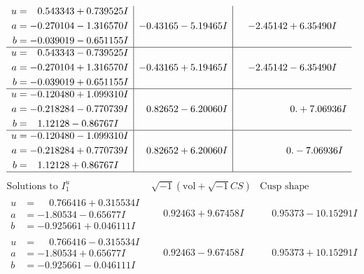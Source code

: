 \documentclass[1p]{elsarticle_modified}
\theoremstyle{definition}
\newcommand{\I}{\sqrt{-1}}
\begin{document}
$$\begin{array}{c|c|c}
\begin{aligned}
u &= \phantom{-}0.543343 + 0.739525 I \\
a &= -0.270104 - 1.316570 I \\
b &= -0.039019 - 0.651155 I\end{aligned}
 & -0.43165 - 5.19465 I & -2.45142 + 6.35490 I \\ \hline\begin{aligned}
u &= \phantom{-}0.543343 - 0.739525 I \\
a &= -0.270104 + 1.316570 I \\
b &= -0.039019 + 0.651155 I\end{aligned}
 & -0.43165 + 5.19465 I & -2.45142 - 6.35490 I \\ \hline\begin{aligned}
u &= -0.120480 + 1.099310 I \\
a &= -0.218284 - 0.770739 I \\
b &= \phantom{-}1.12128 - 0.86767 I\end{aligned}
 & \phantom{-}0.82652 - 6.20060 I & \phantom{-0.000000 -}0. + 7.06936 I \\ \hline\begin{aligned}
u &= -0.120480 - 1.099310 I \\
a &= -0.218284 + 0.770739 I \\
b &= \phantom{-}1.12128 + 0.86767 I\end{aligned}
 & \phantom{-}0.82652 + 6.20060 I & \phantom{-0.000000 } 0. - 7.06936 I\\
 \hline 
 \end{array}$$\newpage$$\begin{array}{c|c|c}  
\text{Solutions to }I^u_{1}& \I (\text{vol} + \sqrt{-1}CS) & \text{Cusp shape}\\
 \hline 
\begin{aligned}
u &= \phantom{-}0.766416 + 0.315534 I \\
a &= -1.80534 - 0.65677 I \\
b &= -0.925661 + 0.046111 I\end{aligned}
 & \phantom{-}0.92463 + 9.67458 I & \phantom{-}0.95373 - 10.15291 I \\ \hline\begin{aligned}
u &= \phantom{-}0.766416 - 0.315534 I \\
a &= -1.80534 + 0.65677 I \\
b &= -0.925661 - 0.046111 I\end{aligned}
 & \phantom{-}0.92463 - 9.67458 I & \phantom{-}0.95373 + 10.15291 I \\ \hline\begin{aligned}

\end{aligned}
\end{array}$$
\end{document}
